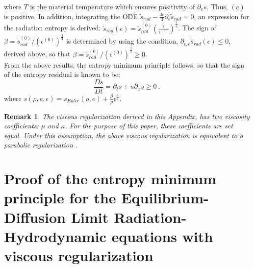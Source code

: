 \documentclass[review]{elsarticle}
\newtheorem{remark}{Remark}[section]
\begin{document}
\begin{appendices}
 where $T$ is the material temperature which ensures positivity of $\partial_e s$. Thus, $(c)$ is positive. In addition, integrating the ODE $\tilde{s}_{rad} - \frac{4\epsilon}{3} \partial_{\epsilon} \tilde{s}_{rad} = 0$, an expression for the radiation entropy is derived: $\tilde{s}_{rad}(\epsilon)  = \tilde{s}_{rad}^{(0)} \left(\frac{\epsilon}{\epsilon^{(0)}}\right)^\frac{3}{4}$. The sign of $\beta = \tilde{s}_{rad}^{(0)} / \left(\epsilon^{(0)}\right)^\frac{3}{4}$ is determined by using the condition, $\partial_{\epsilon,\epsilon} \tilde{s}_{rad}(\epsilon) \leq 0$, derived above, so that $\beta = \tilde{s}_{rad}^{(0)} / \left(\epsilon^{(0)}\right)^\frac{3}{4}\geq0$.\\
From the above results, the entropy minimum principle follows, so that the sign of the entropy residual is known to be:
\begin{equation}
\boxed{\frac{Ds}{Dt} = \partial_t s + u \partial_x s \geq 0} \ ,
\end{equation}
where $s\left( \rho, e, \epsilon \right) = s_{Euler}( \rho, e) + \frac{\beta}{\rho} \epsilon^\frac{3}{4}$. %
\begin{remark}
The viscous regularization derived in this Appendix, has two viscosity coefficients: $\mu$ and $\kappa$. For the purpose of this paper, these coefficients are set equal. Under this assumption, the above viscous regularization is equivalent to a parabolic regularization  \cite{Parabolic}.
\end{remark}

\section{Proof of the entropy minimum principle for the Equilibrium-Diffusion Limit Radiation-Hydrodynamic equations with viscous regularization}
\label{app:appendixB}


\end{appendices}
\end{document}
